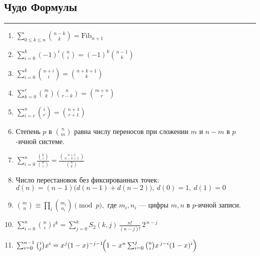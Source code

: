\documentclass[9pt,a4paper,landscape,twosided]{extarticle}
\begin{document}
\begin{multicols*}{3}
\subsection{Чудо Формулы}
\noindent\rule{\linewidth}{0.15mm}

\begingroup
\small

\begin{enumerate}
\item %
$\sum_{0\le k\le n}\binom{n-k}{k}=\mathrm{Fib}_{n+1}$

\item %
$\sum_{i=0}^{k}(-1)^i\binom{n}{i}=(-1)^k\binom{n-1}{k}$

\item %
$\sum_{i=0}^{k}\binom{n+i}{i}=\binom{n+k+1}{k}$

\item %
$\sum_{k=0}^{r}\binom{m}{k}\binom{n}{r-k}=\binom{m+n}{r}$

\item %
$\sum_{i=r}^{n}\binom{i}{r}=\binom{n+1}{r+1}$

\item %
Степень $p$ в $\binom{n}{m}$ равна числу переносов при сложении $m$ и $n-m$ в $p$-ичной системе.

\item %
$\sum_{i=0}^{n}\frac{\binom{k}{i}}{\binom{n}{i}}
=\frac{\binom{n+1}{\,n-k+1\,}}{\binom{n}{k}}$

\item %
Число перестановок без фиксированных точек: \\ $d(n)=(n-1)\bigl(d(n-1)+d(n-2)\bigr),\  d(0)=1,\ d(1)=0$

\item %
$\binom{m}{n}\equiv\prod_i\binom{m_i}{n_i}\pmod p,$
\quad где $m_i,n_i$ — цифры $m,n$ в $p$-ичной записи.

\item %
$\sum_{i=0}^{n}\binom{n}{i}i^k
=\sum_{j=0}^{k}S_2(k,j)\,\frac{n!}{(n-j)!}\,2^{\,n-j}$

\item %
$\sum_{i=0}^{n-1}\binom{i}{j}x^i
= x^j(1-x)^{-j-1}\!\Bigl(1-x^n\sum_{i=0}^j\binom{n}{i}x^{\,j-i}(1-x)^i\Bigr)$


\end{enumerate}
\end{multicols*}
\end{document}
